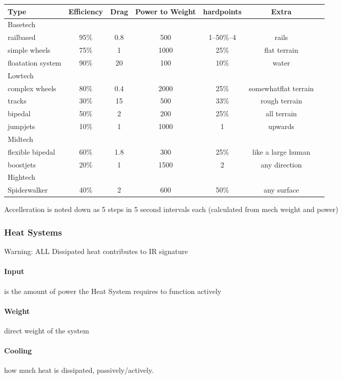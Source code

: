 \begin{tabular}{l|cccccl}
    Type    & Efficiency & Drag & Power to Weight & hardpoints &Extra\\
    \hline
    Basetech\\
    railbased            & 95\%& 0.8 & 500 & 1--50\%--4 & rails \\
    simple wheels        & 75\% & 1 & 1000 & 25\% & flat terrain \\
    floatation system    & 90\% & 20 &  100& 10\% & water\\
    \hline
    Lowtech\\
    complex wheels       & 80\% & 0.4 & 2000 & 25\% &  somewhatflat terrain \\
    tracks               & 30\% & 15 & 500 & 33\% & rough terrain\\
    bipedal              & 50\% & 2& 200 & 25\% & all terrain\\
    jumpjets             & 10\% & 1 &1000 & 1 & upwards\\
    \hline
    Midtech\\
    flexible bipedal     & 60\% & 1.8 & 300 & 25\% &  like a large human\\
    boostjets            & 20\% & 1 & 1500 & 2 &  any direction\\
    \hline Hightech\\
    Spiderwalker         & 40\% & 2 & 600 & 50\% & any surface\\
\end{tabular}\par

Accelleration is noted down as 5 steps in 5 second intervals each (calculated from mech weight and power)

\subsubsection{Heat Systems}\label{sec:heat-systems}
Warning: ALL Dissipated heat contributes to IR signature
\paragraph{Input} is the amount of power the Heat System requires to function actively
\paragraph{Weight} direct weight of the system
\paragraph{Cooling} how much heat is dissipated, passively/actively.
